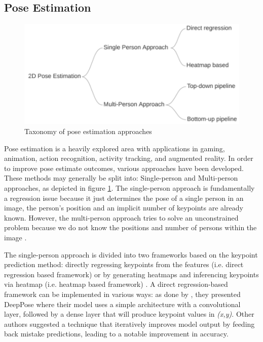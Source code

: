 \subsection{Pose Estimation}
\label{subsec:poseestimation}

\begin{figure}[ht]
  \centering

  \includegraphics[scale=1]{gambar/taxonomy-pose-estimation.png}

  \caption{Taxonomy of pose estimation approaches}
  \label{fig:pose-estimation}
\end{figure}

Pose estimation is a heavily explored area with applications in gaming, animation, action recognition, activity tracking, and augmented reality.
In order to improve pose estimate outcomes, various approaches have been developed. These methods may generally be split into: Single-person and Multi-person approaches, 
as depicted in figure \ref{fig:pose-estimation}. The single-person approach is fundamentally a regression issue because it just determines the pose of a single person in an image, 
the person's position and an implicit number of keypoints are already known. However, the multi-person approach tries to solve an unconstrained problem because we do not know 
the positions and number of persons within the image \parencite{romeo}.

The single-person approach is divided into two frameworks based on the keypoint prediction method: directly regressing keypoints from the features (i.e. direct regression based framework)
or by generating heatmaps and inferencing keypoints via heatmap (i.e. heatmap based framework) \parencite{romeo}.
A direct regression-based framework can be implemented in various ways: as done by \parencite{toshev2014}, 
they presented DeepPose where their model uses a simple architecture with a convolutional layer, followed by a dense layer that will produce keypoint values in \emph{(x,y)}.
Other authors \parencite{carreira2015} suggested a technique that iteratively improves model output by feeding back mistake predictions, leading to a notable improvement in accuracy.

